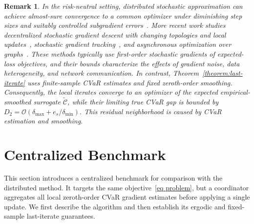 \documentclass[twocolumn]{autart}    %
\newcommand{\order}[1]{\mathcal{O}\left(#1\right)}
\newtheorem{remark}{Remark}
\newcommand{\1}{\mathbf{1}}
\begin{document}
\begin{remark}
In the risk-neutral setting, distributed stochastic approximation can achieve almost-sure convergence to a common optimizer under diminishing step sizes and suitably controlled subgradient errors~\cite{sundhar2010distributed}. More recent work studies decentralized stochastic gradient descent with changing topologies and local updates~\cite{koloskova2020unified}, stochastic gradient tracking~\cite{pu2021distributed}, and asynchronous optimization over graphs~\cite{even2024asynchronous}.
These methods typically use first-order stochastic gradients of expected-loss objectives, and their bounds characterize the effects of gradient noise, data heterogeneity, and network communication. 
In contrast, Theorem~\ref{theorem:last-iterate} uses finite-sample CVaR estimates and fixed zeroth-order smoothing. 
 Consequently, the local iterates converge to an optimizer of the expected 
 empirical-smoothed surrogate $\widetilde{\mathcal C}$, 
 while their limiting true CVaR gap is bounded by $D_2=\order{\delta_{\max}+e_s/\delta_{\min}}$. 
 This residual neighborhood is caused by CVaR estimation and smoothing.
\end{remark}
 

\section{Centralized Benchmark}\label{sec:centralize}

This section introduces a centralized benchmark for comparison with the distributed method. It targets the same objective~\eqref{eq problem}, but a coordinator aggregates all local zeroth-order CVaR gradient estimates before applying a single update. We first describe the algorithm and then establish its ergodic and fixed-sample last-iterate guarantees.
\end{document}
